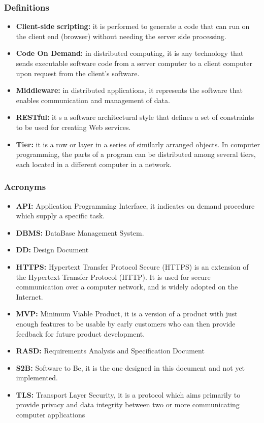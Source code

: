 \subsubsection{Definitions}
\begin{itemize}
    \item \textbf{Client-side scripting:} it is performed to generate a code that can run on the client end (browser) without needing the server side processing.
    \item \textbf{Code On Demand:} in distributed computing, it is any technology that sends executable software code from a server computer to a client computer upon request from the client's software.
    \item \textbf{Middleware:} in distributed applications, it represents the software that enables communication and management of data.
    \item \textbf{RESTful:} it s a software architectural style that defines a set of constraints to be used for creating Web services.
    \item \textbf{Tier:} it is a row or layer in a series of similarly arranged objects. In computer programming, the parts of a program can be distributed among several tiers, each located in a different computer in a network.
    
\end{itemize}

\subsubsection{Acronyms}
\begin{itemize}
    \item \textbf{API:} Application Programming Interface, it indicates on demand procedure which supply a specific task.
    \item \textbf{DBMS:} DataBase Management System.
    \item \textbf{DD:} Design Document    
    \item \textbf{HTTPS:} Hypertext Transfer Protocol Secure (HTTPS) is an extension of the Hypertext Transfer Protocol (HTTP). It is used for secure communication over a computer network, and is widely adopted on the Internet.
    \item \textbf{MVP:} Minimum Viable Product, it is a version of a product with just enough features to be usable by early customers who can then provide feedback for future product development.
    \item \textbf{RASD:} Requirements Analysis and Specification Document
    \item \textbf{S2B:} Software to Be, it is the one designed in this document and not yet implemented.
    \item \textbf{TLS:} Transport Layer Security, it is a protocol which aims primarily to provide privacy and data integrity between two or more communicating computer applications
\end{itemize}
